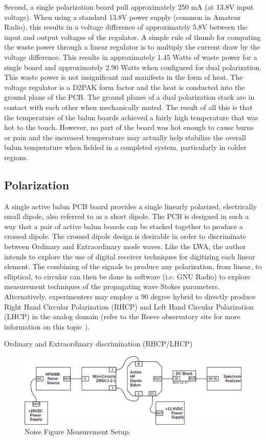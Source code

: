 Second, a single polarization board pull approximately 250 mA (at 13.8V input voltage).
When using a standard 13.8V power supply (common in Amateur Radio), this results in a voltage difference of approximately 5.8V between the input and output voltages of the regulator.
A simple rule of thumb for computing the waste power through a linear regulator is to multiply the current draw by the voltage difference.
This results in approximately 1.45 Watts of waste power for a single board and approximately 2.90 Watts when configured for dual polarization. 
This waste power is not insignificant and manifests in the form of heat.
The voltage regulator is a D2PAK form factor and the heat is conducted into the ground plane of the PCB.
The ground planes of a dual polarization stack are in contact with each other when mechanically mated.
The result of all this is that the temperature of the balun boards achieved a fairly high temperature that was hot to the touch.
However, no part of the board was hot enough to cause burns or pain and the increased temperature may actually help stabilize the overall balun temperature when fielded in a completed system, particularly in colder regions.

\subsection{Polarization}
A single active balun PCB board provides a single linearly polarized, electrically small dipole, also referred to as a short dipole.
The PCB is designed in such a way that a pair of active balun boards can be stacked together to produce a crossed dipole.
The crossed dipole design is desirable in order to discriminate between Ordinary and Extraordinary mode waves.  
Like the LWA, the author intends to explore the use of digital receiver techniques for digitizing each linear element.
The combining of the signals to produce any polarization, from linear, to elliptical, to circular can then be done in software (i.e. GNU Radio) to explore measurement techniques of the propagating wave Stokes parameters.
Alternatively, experimenters may employ a 90 degree hybrid to directly produce Right Hand Circular Polarization (RHCP) and Left Hand Circular Polarization (LHCP) in the analog domain (refer to the Reeve observatory site for more information on this topic \cite{reeve_observatory}).



Ordinary and Extraordinary discrimination (RHCP/LHCP)



\begin{figure}[h]
  \centering
  \includegraphics[width=0.8\linewidth]{figures/noise_figure.png}
  \caption{Noise Figure Measurement Setup.}
  \label{fig:noise_figure}
\end{figure}




